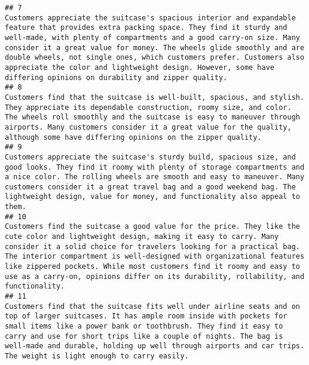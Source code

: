 \documentclass[
]{article}
\begin{document}
\begin{verbatim}
## 7                                                                                                                                            Customers appreciate the suitcase's spacious interior and expandable feature that provides extra packing space. They find it sturdy and well-made, with plenty of compartments and a good carry-on size. Many consider it a great value for money. The wheels glide smoothly and are double wheels, not single ones, which customers prefer. Customers also appreciate the color and lightweight design. However, some have differing opinions on durability and zipper quality.
## 8                                                                                                                                                                                                                                                                           Customers find that the suitcase is well-built, spacious, and stylish. They appreciate its dependable construction, roomy size, and color. The wheels roll smoothly and the suitcase is easy to maneuver through airports. Many customers consider it a great value for the quality, although some have differing opinions on the zipper quality.
## 9                                                                                                                                                                                                                                                         Customers appreciate the suitcase's sturdy build, spacious size, and good looks. They find it roomy with plenty of storage compartments and a nice color. The rolling wheels are smooth and easy to maneuver. Many customers consider it a great travel bag and a good weekend bag. The lightweight design, value for money, and functionality also appeal to them.
## 10                                                                                                                                                                            Customers find the suitcase a good value for the price. They like the cute color and lightweight design, making it easy to carry. Many consider it a solid choice for travelers looking for a practical bag. The interior compartment is well-designed with organizational features like zippered pockets. While most customers find it roomy and easy to use as a carry-on, opinions differ on its durability, rollability, and functionality.
## 11                                                                                                                                                                                                                            Customers find that the suitcase fits well under airline seats and on top of larger suitcases. It has ample room inside with pockets for small items like a power bank or toothbrush. They find it easy to carry and use for short trips like a couple of nights. The bag is well-made and durable, holding up well through airports and car trips. The weight is light enough to carry easily.

\end{verbatim}
\end{document}
